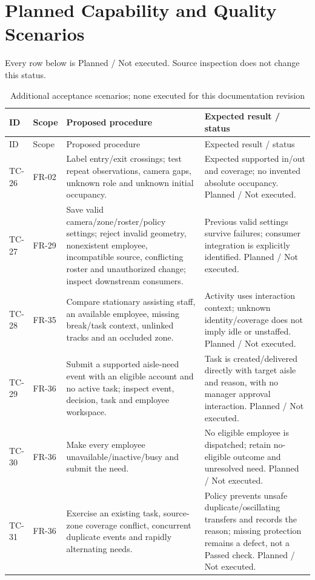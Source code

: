 \section{Planned Capability and Quality Scenarios}
Every row below is Planned / Not executed. Source inspection does not change this status.
\begin{longtable}{P{0.08\textwidth}P{0.13\textwidth}P{0.35\textwidth}P{0.34\textwidth}}
\caption{Additional acceptance scenarios; none executed for this documentation revision}\\
\toprule
ID & Scope & Proposed procedure & Expected result / status\\
\midrule
\endfirsthead
\toprule
ID & Scope & Proposed procedure & Expected result / status\\
\midrule
\endhead
TC-26 & FR-02 & Label entry/exit crossings; test repeat observations, camera gaps, unknown role and unknown initial occupancy. & Expected supported in/out and coverage; no invented absolute occupancy. Planned / Not executed.\\
TC-27 & FR-29 & Save valid camera/zone/roster/policy settings; reject invalid geometry, nonexistent employee, incompatible source, conflicting roster and unauthorized change; inspect downstream consumers. & Previous valid settings survive failures; consumer integration is explicitly identified. Planned / Not executed.\\
TC-28 & FR-35 & Compare stationary assisting staff, an available employee, missing break/task context, unlinked tracks and an occluded zone. & Activity uses interaction context; unknown identity/coverage does not imply idle or unstaffed. Planned / Not executed.\\
TC-29 & FR-36 & Submit a supported aisle-need event with an eligible account and no active task; inspect event, decision, task and employee workspace. & Task is created/delivered directly with target aisle and reason, with no manager approval interaction. Planned / Not executed.\\
TC-30 & FR-36 & Make every employee unavailable/inactive/busy and submit the need. & No eligible employee is dispatched; retain no-eligible outcome and unresolved need. Planned / Not executed.\\
TC-31 & FR-36 & Exercise an existing task, source-zone coverage conflict, concurrent duplicate events and rapidly alternating needs. & Policy prevents unsafe duplicate/oscillating transfers and records the reason; missing protection remains a defect, not a Passed check. Planned / Not executed.\\

\end{longtable}
